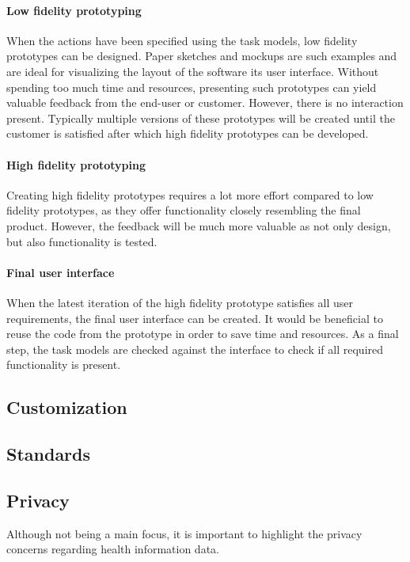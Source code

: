         \paragraph{Low fidelity prototyping} When the actions have been specified using the task models, low fidelity prototypes can be designed. Paper sketches and mockups are such examples and are ideal for visualizing the layout of the software its user interface. Without spending too much time and resources, presenting such prototypes can yield valuable feedback from the end-user or customer. However, there is no interaction present. Typically multiple versions of these prototypes will be created until the customer is satisfied after which high fidelity prototypes can be developed.

        \paragraph{High fidelity prototyping} Creating high fidelity prototypes requires a lot more effort compared to low fidelity prototypes, as they offer functionality closely resembling the final product. However, the feedback will be much more valuable as not only design, but also functionality is tested.

        \paragraph{Final user interface} When the latest iteration of the high fidelity prototype satisfies all user requirements, the final user interface can be created. It would be beneficial to reuse the code from the prototype in order to save time and resources. As a final step, the task models are checked against the interface to check if all required functionality is present.\\


    \subsection{Customization}

    \subsection{Standards} \label{2_standards}

    \subsection{Privacy}
    Although not being a main focus, it is important to highlight the privacy concerns regarding health information data.

    

        

        


